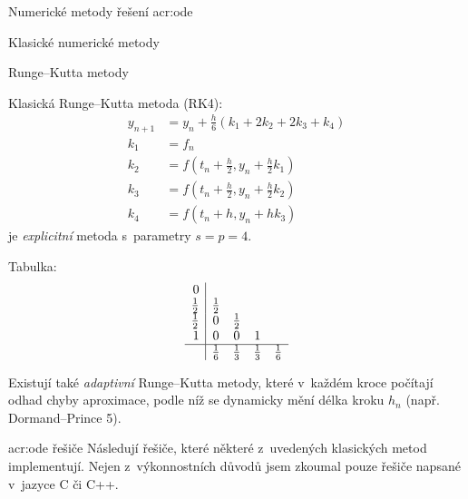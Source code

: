 \documentclass[thesis=M,czech]{FITthesis}[2012/06/26]
\newcommand{\acrlabel}[1]{acr:#1}
\newcommand{\acr}[1]{\acrshort{\acrlabel{#1}}}
\newcommand{\hl}[1]{\textit{#1}}
\begin{document}
\begin{section}{Numerické metody řešení \acr{ode}}
\begin{subsection}{Klasické numerické metody}
\begin{subsubsection}{Runge--Kutta metody}
\begin{paragraph}{Klasická Runge--Kutta metoda (RK4):}
\label{sss:search:ode:classic:rk:rk4}
\begin{equation}\label{eq:ode:rk:rk4}
\begin{split}
   y_{n+1} &= y_{n} + \frac{h}{6} ( k_1 + 2 k_2 + 2 k_3 + k_4 ) \\
   k_1     &= f_n \\
   k_2     &= f \! \left( t_n + \frac{h}{2}, y_n + \frac{h}{2} k_1 \right) \\
   k_3     &= f \! \left( t_n + \frac{h}{2}, y_n + \frac{h}{2} k_2 \right) \\
   k_4     &= f \! \left( t_n + h, y_n + h k_3 \right)
\end{split}
\end{equation}
je \hl{explicitní} metoda s~parametry ${s = p = 4}$.

Tabulka:
\begin{equation*}
\begin{array}{r|cccc}
             0  &             &             &             &             \\
   \frac{1}{2}  & \frac{1}{2} &             &             &             \\
   \frac{1}{2}  &           0 & \frac{1}{2} &             &             \\
             1  &           0 &           0 &           1 &             \\
\hline
                & \frac{1}{6} & \frac{1}{3} & \frac{1}{3} & \frac{1}{6}
\end{array}
\end{equation*}
\end{paragraph} %


\bigskip

Existují také \hl{adaptivní} Runge--Kutta metody,
které v~každém kroce počítají odhad chyby aproximace,
podle níž se dynamicky mění délka kroku $h_n$
(např. Dormand--Prince 5).
\end{subsubsection} %


\begin{subsubsection}{\acr{ode} řešiče}\label{sss:search:ode:classic:solver}
Následují řešiče, které některé z~uvedených klasických metod implementují.
Nejen z~výkonnostních důvodů jsem zkoumal pouze
řešiče napsané v~jazyce C či C++.


\end{subsubsection}
\end{subsection}
\end{section}
\end{document}
